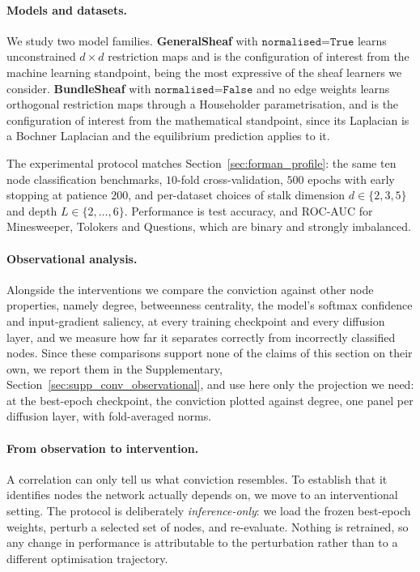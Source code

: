 \paragraph{Models and datasets.}
We study two model families. \textbf{GeneralSheaf} with
$\texttt{normalised=True}$ learns unconstrained $d \times d$ restriction maps
and is the configuration of interest from the machine learning standpoint, being
the most expressive of the sheaf learners we consider. \textbf{BundleSheaf} with
$\texttt{normalised=False}$ and no edge weights learns orthogonal restriction
maps through a Householder parametrisation, and is the configuration of interest
from the mathematical standpoint, since its Laplacian is a Bochner Laplacian and
the equilibrium prediction applies to it.

The experimental protocol matches Section~\ref{sec:forman_profile}: the same ten
node classification benchmarks, $10$-fold cross-validation, $500$ epochs with
early stopping at patience $200$, and per-dataset choices of stalk dimension
$d \in \{2,3,5\}$ and depth $L \in \{2,\dots,6\}$. Performance is test accuracy,
and ROC-AUC for Minesweeper, Tolokers and Questions, which are binary and
strongly imbalanced.

\paragraph{Observational analysis.}
Alongside the interventions we compare the conviction against other node
properties, namely degree, betweenness centrality, the model's softmax
confidence and input-gradient saliency, at every training checkpoint and every
diffusion layer, and we measure how far it separates correctly from incorrectly
classified nodes. Since these comparisons support none of the claims of this
section on their own, we report them in the Supplementary,
Section~\ref{sec:supp_conv_observational}, and use here only the projection we
need: at the best-epoch checkpoint, the conviction plotted against degree, one
panel per diffusion layer, with fold-averaged norms.

\paragraph{From observation to intervention.}
A correlation can only tell us what conviction resembles. To
establish that it identifies nodes the network actually depends on, we move to
an interventional setting. The protocol is deliberately \emph{inference-only}:
we load the frozen best-epoch weights, perturb a selected set of nodes, and
re-evaluate. Nothing is retrained, so any change in performance is attributable
to the perturbation rather than to a different optimisation trajectory.

